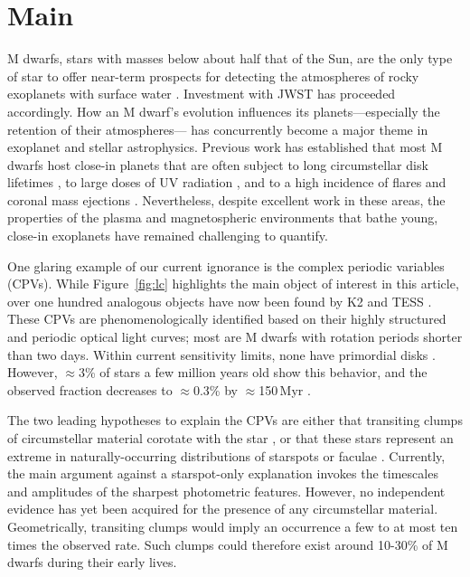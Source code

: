 \documentclass{nature3}
\begin{document}

\section{Main}
\label{sec:main}

M dwarfs, stars with masses below about half that of the Sun, are the
only type of star to offer near-term prospects for detecting the
atmospheres of rocky exoplanets with surface water
\cite{NAP26141}.  Investment with JWST has proceeded accordingly.  How
an M dwarf's evolution influences its planets---especially the
retention of their atmospheres--- has concurrently become a major
theme in exoplanet and stellar astrophysics.  Previous work has
established that most M dwarfs host close-in planets
\cite{Dressing2015} that are often subject to long
circumstellar disk lifetimes \cite{Ribas2015}, to large doses of UV
radiation \cite{France2013}, and to a high incidence of flares and
coronal mass ejections \cite{Gunther2020}.  Nevertheless, despite excellent
work in these areas, the properties of the plasma and magnetospheric
environments that bathe young, close-in exoplanets have remained
challenging to quantify.

One glaring example of our current ignorance is the complex periodic
variables (CPVs).  While Figure~\ref{fig:lc} highlights the main object of
interest in this article, over one hundred analogous objects have
now been found by K2 and TESS 
\cite{Rebull2016,Stauffer2017,Rebull2018,Zhan2019,Rebull2020,Bouma2024}.
These CPVs are
phenomenologically identified based on their highly structured and
periodic optical light curves;
most are M dwarfs with rotation periods shorter than two days.
Within current sensitivity limits, none have primordial disks
\cite{Stauffer2017,Bouma2024}.
However, $\approx$3\% of stars a few million years old show this
behavior, and the observed fraction decreases to $\approx$0.3\%
by $\approx$150\,Myr \cite{Rebull2020}.

The two leading hypotheses to explain the CPVs are either that
transiting clumps of circumstellar material corotate with the star
\cite{Stauffer2017,Gunther2022,Bouma2024}, or that these stars
represent an extreme in naturally-occurring distributions of starspots
or faculae \cite{Koen2021}.  Currently, the main argument against a
starspot-only explanation invokes the timescales and amplitudes of the
sharpest photometric features.  However, no independent evidence has
yet been acquired for the presence of any circumstellar material.  
Geometrically, transiting clumps would imply an occurrence
a few to at most ten times the observed rate.
Such clumps could therefore exist around 10-30\% of M dwarfs during
their early lives.
\end{document}
